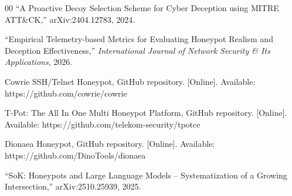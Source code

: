 \documentclass[conference]{IEEEtran}
\begin{document}
\begin{thebibliography}{00}
 ``A Proactive Decoy Selection Scheme for Cyber Deception using MITRE ATT\&CK,'' arXiv:2404.12783, 2024.

 ``Empirical Telemetry-based Metrics for Evaluating Honeypot Realism and Deception Effectiveness,'' \emph{International Journal of Network Security \& Its Applications}, 2026.

 Cowrie SSH/Telnet Honeypot, GitHub repository. [Online]. Available: https://github.com/cowrie/cowrie

 T-Pot: The All In One Multi Honeypot Platform, GitHub repository. [Online]. Available: https://github.com/telekom-security/tpotce

 Dionaea Honeypot, GitHub repository. [Online]. Available: https://github.com/DinoTools/dionaea

 ``SoK: Honeypots and Large Language Models -- Systematization of a Growing Intersection,'' arXiv:2510.25939, 2025.

\end{thebibliography}
\end{document}
